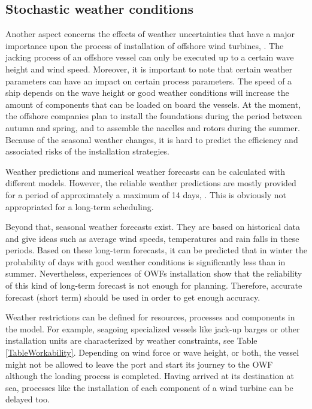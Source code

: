 \subsection{Stochastic weather conditions}
Another aspect concerns the effects of weather uncertainties that have a major importance upon the process of installation of offshore wind turbines, \cite{COMPIT11}. The jacking process of an offshore vessel can only be executed up to a certain wave height and wind speed. Moreover, it is important to note that certain weather parameters can have an impact on certain process parameters. The speed of a ship depends on the wave height or good weather conditions will increase the amount of components that can be loaded on board the vessels. At the moment, the offshore companies plan to install the foundations during the period between autumn and spring, and to assemble the nacelles and rotors during the summer. Because of the seasonal weather changes, it is hard to predict the efficiency and associated risks of the installation strategies.

Weather predictions and numerical weather forecasts can be calculated with different models. However, the reliable weather predictions are mostly provided for a period of approximately a maximum of 14 days, \cite{hinnenthal2007}. This is obviously not appropriated for a long-term scheduling.

Beyond that, seasonal weather forecasts exist. They are based on historical data and give ideas such as average wind speeds, temperatures and rain falls in these periods. Based on these long-term forecasts, it can be predicted that in winter the probability of days with good weather conditions is significantly less than in summer. Nevertheless, experiences of OWFs installation show that the reliability of this kind of long-term forecast is not enough for planning. Therefore, accurate forecast (short term) should be used in order to get enough accuracy.

Weather restrictions can be defined for resources, processes and components in the model. For example, seagoing specialized vessels like jack-up barges or other installation units are characterized by weather constraints, see Table \ref{TableWorkability}. Depending on wind force or wave height, or both, the vessel might not be allowed to leave the port and start its journey to the OWF although the loading process is completed. Having arrived at its destination at sea, processes like the installation of each component of a wind turbine can be delayed too.

